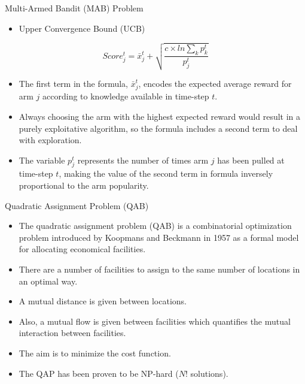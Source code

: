 \documentclass{beamer}
\begin{document}
\begin{frame}[t]{Multi-Armed Bandit (MAB) Problem} %
\begin{itemize}
\item Upper Convergence Bound (UCB)
\end{itemize}
\begin{equation}
Score_{j}^{t}=\bar{x}_{j}^{t}+\sqrt{\frac{c\times ln\sum_{k}p_{k}^{t}}{p_{j}^{t}}}
\end{equation}
\footnotesize
\begin{itemize}
\item  The first term in the formula, $\bar{x}_{j}^{t}$, encodes the expected average reward for arm $j$ according to knowledge available in time-step $t$.
\item Always choosing the arm with the highest expected reward would result in a purely exploitative algorithm, so the formula includes a second term to deal with exploration.
\item The variable $p_{j}^{t}$ represents the number of times arm $j$ has been pulled at time-step $t$, making the value of the second term in formula inversely proportional to the arm popularity.
\end{itemize}
\end{frame}

\begin{frame}[t]{Quadratic Assignment Problem (QAB)} %
\small
\begin{itemize}
\item The quadratic assignment problem (QAB) is a combinatorial optimization problem introduced by Koopmans and Beckmann in 1957 as a formal model for allocating economical facilities.
\item There are a number of facilities to assign to the same number of locations in an optimal way.
\item A mutual distance is given between locations.
\item Also, a mutual flow is given between facilities which quantifies the mutual interaction between facilities.
\item The aim is to minimize the cost function.
\item The QAP has been proven to be NP-hard ($N!$ solutions).
\end{itemize}
\end{frame}
\end{document}
